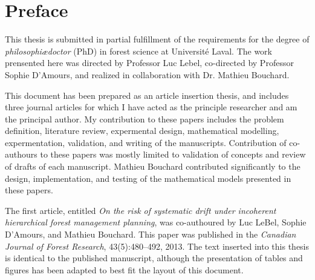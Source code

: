 

\chapter*{Preface}

This thesis is submitted in partial fulfillment of the requirements for the degree of \emph{philosophi\ae doctor} (PhD) in forest science at Université Laval. 
The work prensented here was directed by Professor Luc Lebel, co-directed by Professor Sophie D'Amours, and realized in collaboration with Dr. Mathieu Bouchard.

This document has been prepared as an article insertion thesis, and includes three journal articles for which I have acted as the principle researcher and am the principal author. 
My contribution to these papers includes the problem definition, literature review, expermental design, mathematical modelling, expermentation, validation, and writing of the manuscripts. 
Contribution of co-authours to these papers was mostly limited to validation of concepts and review of drafts of each manuscript.
Mathieu Bouchard contributed significantly to the design, implementation, and testing of the mathematical models presented in these papers.

The first article, entitled \emph{On the risk of systematic drift under incoherent hierarchical forest management planning}, was co-authoured by Luc LeBel, Sophie D'Amours, and Mathieu Bouchard. 
This paper was published in the \emph{Canadian Journal of Forest Research}, 43(5):480--492, 2013. 
The text inserted into this thesis is identical to the published manuscript, although the presentation of tables and figures has been adapted to best fit the layout of this document. 

